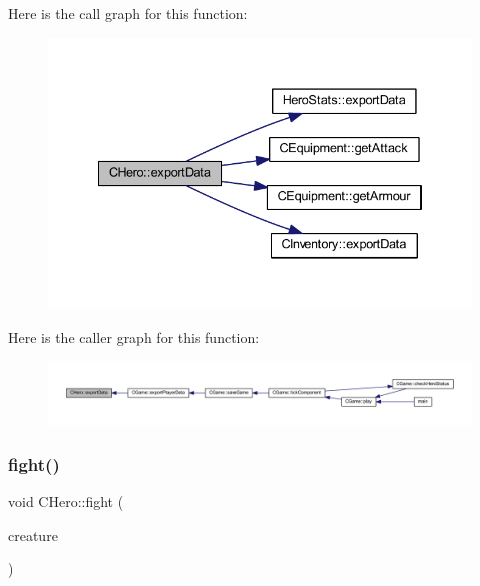 Here is the call graph for this function\+:\nopagebreak
\begin{figure}[H]
\begin{center}
\leavevmode
\includegraphics[width=334pt]{class_c_hero_a1593ac4dfc01368e99b2b82a21c3c6ed_cgraph}
\end{center}
\end{figure}
Here is the caller graph for this function\+:\nopagebreak
\begin{figure}[H]
\begin{center}
\leavevmode
\includegraphics[width=350pt]{class_c_hero_a1593ac4dfc01368e99b2b82a21c3c6ed_icgraph}
\end{center}
\end{figure}
\mbox{\label{class_c_hero_a7cda26a24b8e70fc2ffe829e9c984b7e}} 
\subsubsection{\texorpdfstring{fight()}{fight()}}
{\footnotesize\ttfamily void C\+Hero\+::fight (\begin{DoxyParamCaption}\item[{const \mbox{\hyperlink{class_c_creature}{C\+Creature}} \&}]{creature }\end{DoxyParamCaption})}

